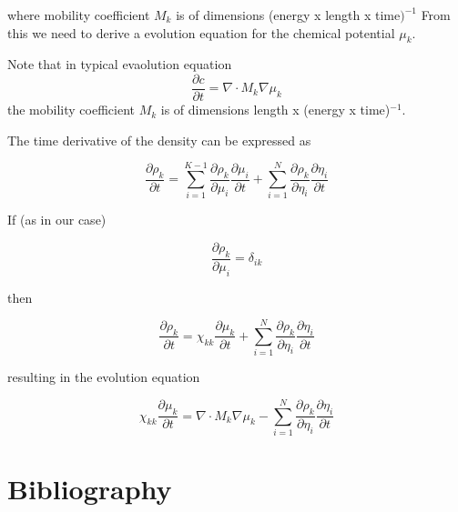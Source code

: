 \documentclass[11pt]{article}
\begin{document}
where mobility coefficient \(M_k\) is of dimensions (energy x length x time\()^{-1}\)
From this we need to derive a evolution equation for the chemical potential \(\mu_k\).

Note that in typical evaolution equation
$$
\frac{\partial c}{\partial t} = \nabla \cdot M_k \nabla \mu_k
$$
the mobility coefficient \(M_k\) is of dimensions length x (energy x time)\(^{-1}\).

The time derivative of the density can be expressed as

$$
\frac{\partial \rho_k}{\partial t} = \sum_{i=1}^{K-1} \frac{\partial \rho_k}{\partial \mu_i} \frac{\partial \mu_i}{\partial t} + \sum_{i=1}^{N} \frac{\partial \rho_k}{\partial \eta_i} \frac{\partial \eta_i}{\partial t}
$$

If (as in our case)

$$
\frac{\partial \rho_k}{\partial \mu_i} = \delta_{ik}
$$

then

$$
\frac{\partial \rho_k}{\partial t} = \chi_{kk} \frac{\partial \mu_k}{\partial t} + \sum_{i=1}^{N} \frac{\partial \rho_k}{\partial \eta_i} \frac{\partial \eta_i}{\partial t}
$$

resulting in the evolution equation

$$
\chi_{kk} \frac{\partial \mu_k}{\partial t} = \nabla \cdot M_k \nabla \mu_k - \sum_{i=1}^N \frac{\partial \rho_k}{\partial \eta_i} \frac{\partial \eta_i}{\partial t}
$$



\section{Bibliography}
\label{sec:org642fa88}
\end{document}
